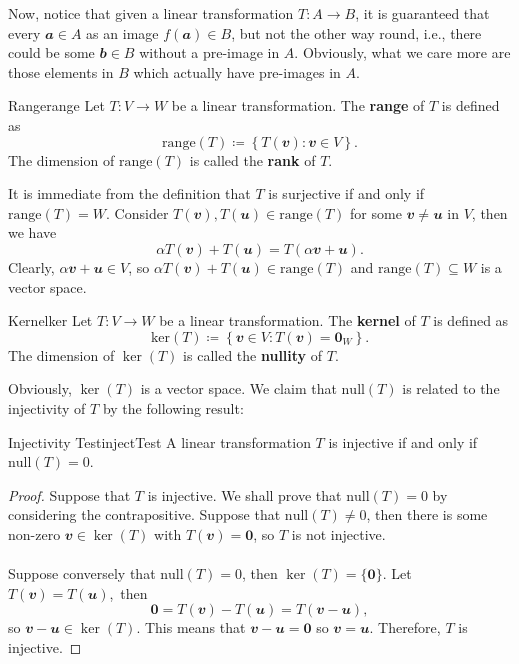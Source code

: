 \documentclass[math]{amznotes}
\theoremstyle{remark}
\newcommand{\zero}{\mathbf{0}}
\begin{document}
Now, notice that given a linear transformation $T \colon A \to B$, it is guaranteed that every $\mathbfit{a} \in A$ as an image $f(\mathbfit{a}) \in B$, but not the other way round, i.e., there could be some $\mathbfit{b} \in B$ without a pre-image in $A$. Obviously, what we care more are those elements in $B$ which actually have pre-images in $A$.
\begin{dfnbox}{Range}{range}
    Let $T \colon V \to W$ be a linear transformation. The {\color{red} \textbf{range}} of $T$ is defined as
    \begin{equation*}
        \mathrm{range}(T) \coloneqq \left\{T(\mathbfit{v}) \colon \mathbfit{v} \in V\right\}.
    \end{equation*}
    The dimension of $\mathrm{range}(T)$ is called the {\color{red} \textbf{rank}} of $T$.
\end{dfnbox}
It is immediate from the definition that $T$ is surjective if and only if $\mathrm{range}(T) = W$. Consider $T(\mathbfit{v}), T(\mathbfit{u}) \in \mathrm{range}(T)$ for some $\mathbfit{v} \neq \mathbfit{u}$ in $V$, then we have
\begin{equation*}
    \alpha T(\mathbfit{v}) + T(\mathbfit{u}) = T(\alpha\mathbfit{v} + \mathbfit{u}).
\end{equation*}
Clearly, $\alpha\mathbfit{v} + \mathbfit{u} \in V$, so $\alpha T(\mathbfit{v}) + T(\mathbfit{u}) \in \mathrm{range}(T)$ and $\mathrm{range}(T) \subseteq W$ is a vector space.
\begin{dfnbox}{Kernel}{ker}
    Let $T \colon V \to W$ be a linear transformation. The {\color{red} \textbf{kernel}} of $T$ is defined as 
    \begin{equation*}
        \mathrm{ker}(T) \coloneqq \left\{\mathbfit{v} \in V \colon T(\mathbfit{v}) = \zero_{W}\right\}.
    \end{equation*}
    The dimension of $\ker(T)$ is called the {\color{red} \textbf{nullity}} of $T$.
\end{dfnbox}
Obviously, $\ker(T)$ is a vector space. We claim that $\mathrm{null}(T)$ is related to the injectivity of $T$ by the following result:
\begin{probox}{Injectivity Test}{injectTest}
    A linear transformation $T$ is injective if and only if $\mathrm{null}(T) = 0$.
    \tcblower
    \begin{proof}
        Suppose that $T$ is injective. We shall prove that $\mathrm{null}(T) = 0$ by considering the contrapositive. Suppose that $\mathrm{null}(T) \neq 0$, then there is some non-zero $\mathbfit{v} \in \ker(T)$ with $T(\mathbfit{v}) = \zero$, so $T$ is not injective.
        \\\\
        Suppose conversely that $\mathrm{null}(T) = 0$, then $\ker(T) = \{\zero\}$. Let $T(\mathbfit{v}) = T(\mathbfit{u})$,~then
        \begin{equation*}
            \zero = T(\mathbfit{v}) - T(\mathbfit{u}) = T(\mathbfit{v - u}),
        \end{equation*}
        so $\mathbfit{v - u} \in \ker(T)$. This means that $\mathbfit{v - u} = \zero$ so $\mathbfit{v = u}$. Therefore, $T$ is injective.
    \end{proof}
\end{probox}
\end{document}
